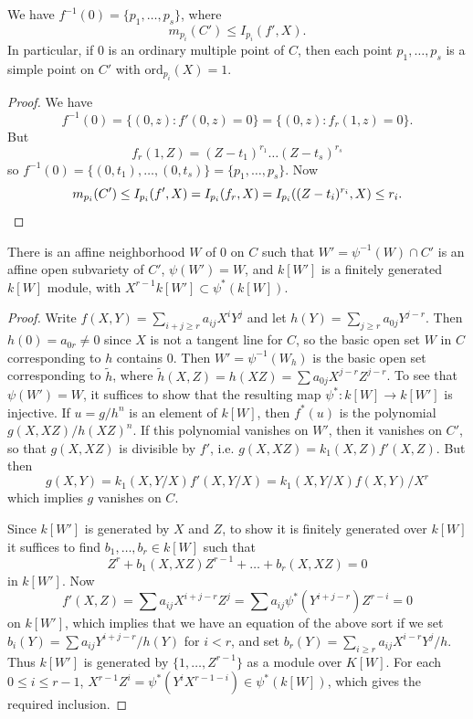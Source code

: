 \begin{lemma}
    We have $f^{-1}(0) = \{ p_1,\dots,p_s \}$, where
    \[ m_{p_i}(C') \leq I_{p_i}(f',X). \]
    In particular, if $0$ is an ordinary multiple point of $C$, then each point $p_1,\dots,p_s$ is a simple point on $C'$ with $\text{ord}_{p_i}(X) = 1$.
\end{lemma}
\begin{proof}
    We have
    \[ f^{-1}(0) = \{ (0,z) : f'(0,z) = 0 \} = \{ (0,z) : f_r(1,z) = 0 \}. \]
    But
    \[ f_r(1,Z) = (Z - t_1)^{r_1} \dots (Z - t_s)^{r_s} \]
    so $f^{-1}(0) = \{ (0,t_1), \dots, (0,t_s) \} = \{ p_1,\dots,p_s \}$. Now
    \[ m_{p_i}(C') \leq I_{p_i}(f',X) = I_{p_i}(f_r,X) = I_{p_i}((Z - t_i)^{r_i},X) \leq r_i. \qedhere \]
\end{proof}

\begin{theorem}
    There is an affine neighborhood $W$ of $0$ on $C$ such that $W' = \psi^{-1}(W) \cap C'$ is an affine open subvariety of $C'$, $\psi(W') = W$, and $k[W']$ is a finitely generated $k[W]$ module, with $X^{r-1} k[W'] \subset \psi^*(k[W])$.
\end{theorem}
\begin{proof}
    Write $f(X,Y) = \sum_{i + j \geq r} a_{ij} X^i Y^j$ and let $h(Y) = \sum_{j \geq r} a_{0j} Y^{j-r}$. Then $h(0) = a_{0r} \neq 0$ since $X$ is not a tangent line for $C$, so the basic open set $W$ in $C$ corresponding to $h$ contains $0$. Then $W' = \psi^{-1}(W_h)$ is the basic open set corresponding to $\tilde{h}$, where $\tilde{h}(X,Z) = h(XZ) = \sum a_{0j} X^{j-r} Z^{j-r}$. To see that $\psi(W') = W$, it suffices to show that the resulting map $\psi^*: k[W] \to k[W']$ is injective. If $u = g/h^n$ is an element of $k[W]$, then $f^*(u)$ is the polynomial $g(X,XZ)/h(XZ)^n$. If this polynomial vanishes on $W'$, then it vanishes on $C'$, so that $g(X,XZ)$ is divisible by $f'$, i.e. $g(X,XZ) = k_1(X,Z) f'(X,Z)$. But then
    \[ g(X,Y) = k_1(X,Y/X) f'(X,Y/X) = k_1(X,Y/X) f(X,Y) / X^r \]
    which implies $g$ vanishes on $C$.

    Since $k[W']$ is generated by $X$ and $Z$, to show it is finitely generated over $k[W]$ it suffices to find $b_1,\dots,b_r \in k[W]$ such that
    \[ Z^r + b_1(X,XZ) Z^{r-1} + \dots + b_r(X,XZ) = 0 \]
    in $k[W']$. Now
    \[ f'(X,Z) = \sum a_{ij} X^{i+j-r} Z^j = \sum a_{ij} \psi^*(Y^{i+j-r}) Z^{r-i} = 0 \]
    on $k[W']$, which implies that we have an equation of the above sort if we set $b_i(Y) = \sum a_{ij} Y^{i+j-r} / h(Y)$ for $i < r$, and set $b_r(Y) = \sum_{i \geq r} a_{ij} X^{i-r} Y^j / h$. Thus $k[W']$ is generated by $\{ 1, \dots, Z^{r-1} \}$ as a module over $K[W]$. For each $0 \leq i \leq r-1$, $X^{r-1} Z^i = \psi^*(Y^i X^{r-1-i}) \in \psi^*(k[W])$, which gives the required inclusion.
\end{proof}




